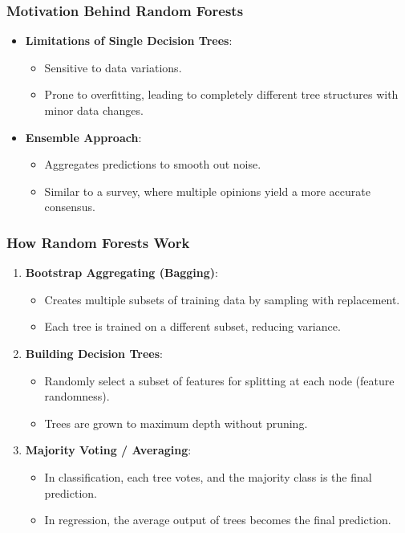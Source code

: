 \documentclass[aspectratio=169]{beamer}
\begin{document}
\begin{frame}[fragile]
    \frametitle{Motivation Behind Random Forests}
    \begin{itemize}
        \item \textbf{Limitations of Single Decision Trees}:
        \begin{itemize}
            \item Sensitive to data variations.
            \item Prone to overfitting, leading to completely different tree structures with minor data changes.
        \end{itemize}
        
        \item \textbf{Ensemble Approach}:
        \begin{itemize}
            \item Aggregates predictions to smooth out noise.
            \item Similar to a survey, where multiple opinions yield a more accurate consensus.
        \end{itemize}
    \end{itemize}
\end{frame}

\begin{frame}[fragile]
    \frametitle{How Random Forests Work}
    \begin{enumerate}
        \item \textbf{Bootstrap Aggregating (Bagging)}:
            \begin{itemize}
                \item Creates multiple subsets of training data by sampling with replacement.
                \item Each tree is trained on a different subset, reducing variance.
            \end{itemize}
        
        \item \textbf{Building Decision Trees}:
            \begin{itemize}
                \item Randomly select a subset of features for splitting at each node (feature randomness).
                \item Trees are grown to maximum depth without pruning.
            \end{itemize}
        
        \item \textbf{Majority Voting / Averaging}:
            \begin{itemize}
                \item In classification, each tree votes, and the majority class is the final prediction.
                \item In regression, the average output of trees becomes the final prediction.
            \end{itemize}
    \end{enumerate}
\end{frame}
\end{document}
